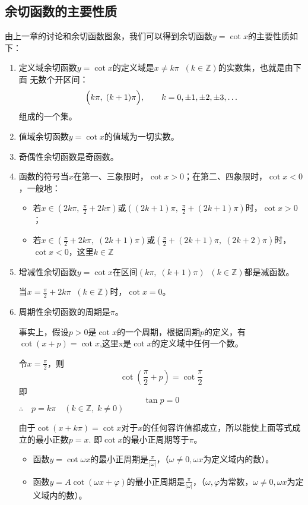 \subsection{余切函数的主要性质}

由上一章的讨论和余切函数图象，我们可以得到余切函数$y=\cot x$的主要性质如下：
\begin{enumerate}
    \item 定义域\quad 余切函数$y=\cot x$的定义域是$x\ne k\pi\;\;(k\in\mathbb{Z})$的实数集，也就是由下面
无数个开区间：
\[\Bigl(k\pi,\; (k+1)\pi\Bigr), \qquad k=0,\pm1,\pm2,\pm3,\ldots\]
组成的一个集。

\item 值域\quad 余切函数$y=\cot x$的值域为一切实数。
\item 奇偶性\quad 余切函数是奇函数。
\item 函数的符号\quad 当$x$在第一、三象限时，$\cot x>0$；在第二、四象限时，$\cot x<0$，一般地：
\begin{itemize}
    \item 若$x\in\left(2k\pi,\;\frac{\pi}{2}+2k\pi\right)$或$\left((2k+1)\pi,\;\frac{\pi}{2}+(2k+1)\pi\right)$时，$\cot x>0$；
    \item 若$x\in\left(\frac{\pi}{2}+2k\pi,\; (2k+1)\pi\right)$或$\left(\frac{\pi}{2}+(2k+1)\pi,\; (2k+2)\pi\right)$时，$\cot x<0$，这里$k\in\mathbb{Z}$
\end{itemize}

\item 增减性\quad 余切函数$y=\cot x$在区间$(k\pi,\; (k+1)\pi)\;\; (k\in\mathbb{Z})$都是减函数。

当$x=\frac{\pi}{2}+2k\pi\;\; (k\in\mathbb{Z})$时，$\cot x=0$。

\item 周期性\quad 余切函数的周期是$\pi$。

事实上，假设$p>0$是$\cot x$的一个周期，根据周期$p$的定义，有$\cot (x+p)=\cot x$,这里x是$\cot x$的定义域中任何一个数。

令$x=\frac{\pi}{2}$，则
\[\cot\left(\frac{\pi}{2}+p\right)=\cot\frac{\pi}{2}\]
即$$\tan p=0$$
$\therefore\quad p=k\pi\quad (k\in\mathbb{Z},\; k\ne 0)$

由于$\cot(x+k\pi)=\cot x$对于$x$的任何容许值都成立，所以能使上面等式成立的最小正数$p=x$. 即$\cot x$的最小正周期等于$\pi$。

\begin{itemize}
    \item 函数$y=\cot \omega x$的最小正周期是$\frac{\pi}{|\omega|}$，（$\omega\ne 0, \omega x$为定义域内的数）。
    \item 函数$y=A\cot (\omega x+\varphi)$的最小正周期是$\frac{\pi}{|\omega|}$，（$\omega,\varphi$为常数，$\omega\ne 0, \omega x$为定义域内的数）。
\end{itemize}


\end{enumerate}
